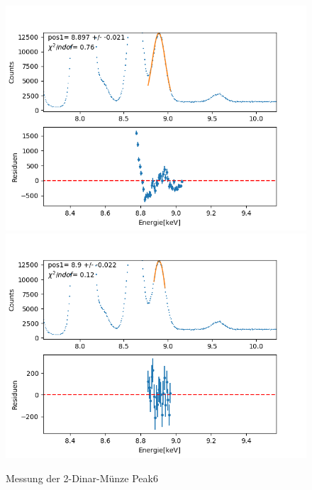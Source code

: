 \documentclass[12pt,a4paper]{article}
\begin{document}
\begin{figure}[H]
\centering
\includegraphics[scale=0.49]{Bilder/roentgen_spektren/denar/den6_1.png}
\includegraphics[scale=0.49]{Bilder/roentgen_spektren/denar/den6_2.png}
\caption{Messung der 2-Dinar-Münze Peak6}
\end{figure}
\end{document}
